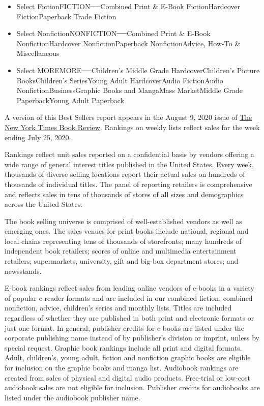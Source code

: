 \begin{itemize}
\tightlist
\item
  Select FictionFICTION──Combined Print \& E-Book FictionHardcover
  FictionPaperback Trade Fiction
\item
  Select NonfictionNONFICTION──Combined Print \& E-Book
  NonfictionHardcover NonfictionPaperback NonfictionAdvice, How-To \&
  Miscellaneous
\item
  Select MOREMORE──Children's Middle Grade HardcoverChildren's Picture
  BooksChildren's SeriesYoung Adult HardcoverAudio FictionAudio
  NonfictionBusinessGraphic Books and MangaMass MarketMiddle Grade
  PaperbackYoung Adult Paperback
\end{itemize}

A version of this Best Sellers report appears in the August 9, 2020
issue of
\href{http://www.nytimes3xbfgragh.onion/section/books/review}{The New
York Times Book Review}. Rankings on weekly lists reflect sales for the
week ending July 25, 2020.

Rankings reflect unit sales reported on a confidential basis by vendors
offering a wide range of general interest titles published in the United
States. Every week, thousands of diverse selling locations report their
actual sales on hundreds of thousands of individual titles. The panel of
reporting retailers is comprehensive and reflects sales in tens of
thousands of stores of all sizes and demographics across the United
States.

The book selling universe is comprised of well-established vendors as
well as emerging ones. The sales venues for print books include
national, regional and local chains representing tens of thousands of
storefronts; many hundreds of independent book retailers; scores of
online and multimedia entertainment retailers; supermarkets, university,
gift and big-box department stores; and newsstands.

E-book rankings reflect sales from leading online vendors of e-books in
a variety of popular e-reader formats and are included in our combined
fiction, combined nonfiction, advice, children's series and monthly
lists. Titles are included regardless of whether they are published in
both print and electronic formats or just one format. In general,
publisher credits for e-books are listed under the corporate publishing
name instead of by publisher's division or imprint, unless by special
request. Graphic book rankings include all print and digital formats.
Adult, children's, young adult, fiction and nonfiction graphic books are
eligible for inclusion on the graphic books and manga list. Audiobook
rankings are created from sales of physical and digital audio products.
Free-trial or low-cost audiobook sales are not eligible for inclusion.
Publisher credits for audiobooks are listed under the audiobook
publisher name.

